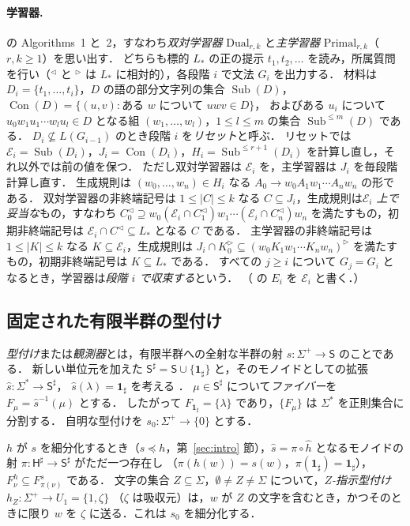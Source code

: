 \documentclass[11pt,a4paper]{ltjsarticle}
\numberwithin{equation}{section}
\theoremstyle{plain}
\theoremstyle{definition}
\theoremstyle{remark}
\theoremstyle{plain}
\newcommand{\eps}{\lambda}
\newcommand{\R}{^{\rhd}}
\newcommand{\Lc}{^{\lhd}}
\newcommand{\Sub}{\operatorname{Sub}}
\newcommand{\Con}{\operatorname{Con}}
\newcommand{\one}{\mathbf 1_\sharp}
\begin{document}
\paragraph{学習器.}
\citet{ky2017} の Algorithms~1 と~2，すなわち\emph{双対学習器} $\mathrm{Dual}_{r,k}$ と\emph{主学習器} $\mathrm{Primal}_{r,k}$（$r,k\ge1$）を思い出す．
どちらも標的 $L_*$ の正の提示 $t_1,t_2,\dots$ を読み，所属質問を行い（$\Lc$ と $\R$ は $L_*$ に相対的），各段階 $i$ で文法 $G_i$ を出力する．
材料は $D_i=\{t_1,\dots,t_i\}$，$D$ の語の部分文字列の集合 $\Sub(D)$，$\Con(D)=\{(u,v):\text{ある }w\text{ について }uwv\in D\}$，
およびある $u_i$ について $u_0w_1u_1\cdots w_lu_l\in D$ となる組 $(w_1,\dots,w_l)$，$1\le l\le m$ の集合 $\Sub^{\le m}(D)$ である．
$D_i\not\subseteq L(G_{i-1})$ のとき段階 $i$ を\emph{リセット}と呼ぶ．
リセットでは $\mathcal E_i=\Sub(D_i)$，$J_i=\Con(D_i)$，$H_i=\Sub^{\le r+1}(D_i)$ を計算し直し，それ以外では前の値を保つ．
ただし双対学習器は $\mathcal E_i$ を，主学習器は $J_i$ を毎段階計算し直す．
生成規則は $(w_0,\dots,w_n)\in H_i$ なる $A_0\to w_0A_1w_1\cdots A_nw_n$ の形である．
双対学習器の非終端記号は $1\le|C|\le k$ なる $C\subseteq J_i$，生成規則は\emph{$\mathcal E_i$ 上で妥当な}もの，すなわち
$C_0\Lc\supseteq w_0(\mathcal E_i\cap C_1\Lc)w_1\cdots(\mathcal E_i\cap C_n\Lc)w_n$ を満たすもの，初期非終端記号は $\mathcal E_i\cap C\Lc\subseteq L_*$ となる $C$ である．
主学習器の非終端記号は $1\le|K|\le k$ なる $K\subseteq\mathcal E_i$，生成規則は $J_i\cap K_0\R\subseteq(w_0K_1w_1\cdots K_nw_n)\R$ を満たすもの，初期非終端記号は $K\subseteq L_*$ である．
すべての $j\ge i$ について $G_j=G_i$ となるとき，学習器は\emph{段階 $i$ で収束する}という．
（\citet{ky2017} の $E_i$ を $\mathcal E_i$ と書く．）

\subsection*{固定された有限半群の型付け}
\emph{型付け}または\emph{観測器}とは，有限半群への全射な半群の射 $s:\Sigma^+\to\mathsf S$ のことである．
新しい単位元を加えた $\mathsf S^\sharp=\mathsf S\cup\{\one\}$ と，そのモノイドとしての拡張 $\widehat s:\Sigma^*\to\mathsf S^\sharp$，
$\widehat s(\eps)=\one$ を考える \citep[Lemma~2.2]{kuriyama-tcs1}．
$\mu\in\mathsf S^\sharp$ について\emph{ファイバー}を $F_\mu=\widehat s^{-1}(\mu)$ とする．
したがって $F_{\one}=\{\eps\}$ であり，$\{F_\mu\}$ は $\Sigma^*$ を正則集合に分割する．
自明な型付けを $s_0:\Sigma^+\to\{0\}$ とする．

$h$ が $s$ を細分化するとき（$s\preceq h$，第~\ref{sec:intro} 節），$\widehat s=\pi\circ\widehat h$ となるモノイドの射 $\pi:\mathsf H^\sharp\to\mathsf S^\sharp$ がただ一つ存在し
（$\pi(h(w))=s(w)$，$\pi(\one)=\one$），$F^h_\nu\subseteq F^s_{\pi(\nu)}$ である．
文字の集合 $Z\subseteq\Sigma$，$\emptyset\ne Z\ne\Sigma$ について，\emph{$Z$-指示型付け} $h_Z:\Sigma^+\to U_1=\{1,\zeta\}$
（$\zeta$ は吸収元）は，$w$ が $Z$ の文字を含むとき，かつそのときに限り $w$ を $\zeta$ に送る．これは $s_0$ を細分化する．
\end{document}
